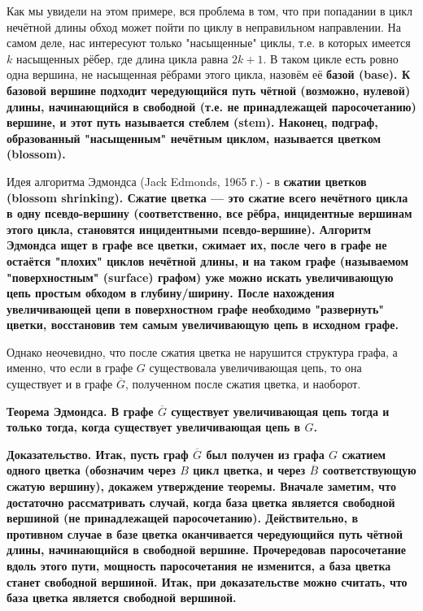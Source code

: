 
Как мы увидели на этом примере, вся проблема в том, что при попадании в цикл нечётной длины обход может пойти по циклу в неправильном направлении. На самом деле, нас интересуют только "насыщенные" циклы, т.е. в которых имеется $k$ насыщенных рёбер, где длина цикла равна $2k+1$. В таком цикле есть ровно одна вершина, не насыщенная рёбрами этого цикла, назовём её \bf{базой} (base). К базовой вершине подходит чередующийся путь чётной (возможно, нулевой) длины, начинающийся в свободной (т.е. не принадлежащей паросочетанию) вершине, и этот путь называется \bf{стеблем} (stem). Наконец, подграф, образованный "насыщенным" нечётным циклом, называется \bf{цветком} (blossom).


Идея алгоритма Эдмондса (Jack Edmonds, 1965 г.) - в \bf{сжатии цветков} (blossom shrinking). Сжатие цветка --- это сжатие всего нечётного цикла в одну псевдо-вершину (соответственно, все рёбра, инцидентные вершинам этого цикла, становятся инцидентными псевдо-вершине). Алгоритм Эдмондса ищет в графе все цветки, сжимает их, после чего в графе не остаётся "плохих" циклов нечётной длины, и на таком графе (называемом "поверхностным" (surface) графом) уже можно искать увеличивающую цепь простым обходом в глубину/ширину. После нахождения увеличивающей цепи в поверхностном графе необходимо "развернуть" цветки, восстановив тем самым увеличивающую цепь в исходном графе.

Однако неочевидно, что после сжатия цветка не нарушится структура графа, а именно, что если в графе $G$ существовала увеличивающая цепь, то она существует и в графе $\overline G$, полученном после сжатия цветка, и наоборот.

\bf{Теорема Эдмондса}. В графе $\overline G$ существует увеличивающая цепь тогда и только тогда, когда существует увеличивающая цепь в $G$.

\bf{Доказательство}. Итак, пусть граф $\overline G$ был получен из графа $G$ сжатием одного цветка (обозначим через $B$ цикл цветка, и через $\overline B$ соответствующую сжатую вершину), докажем утверждение теоремы. Вначале заметим, что достаточно рассматривать случай, когда база цветка является свободной вершиной (не принадлежащей паросочетанию). Действительно, в противном случае в базе цветка оканчивается чередующийся путь чётной длины, начинающийся в свободной вершине. Прочередовав паросочетание вдоль этого пути, мощность паросочетания не изменится, а база цветка станет свободной вершиной. Итак, при доказательстве можно считать, что база цветка является свободной вершиной.

